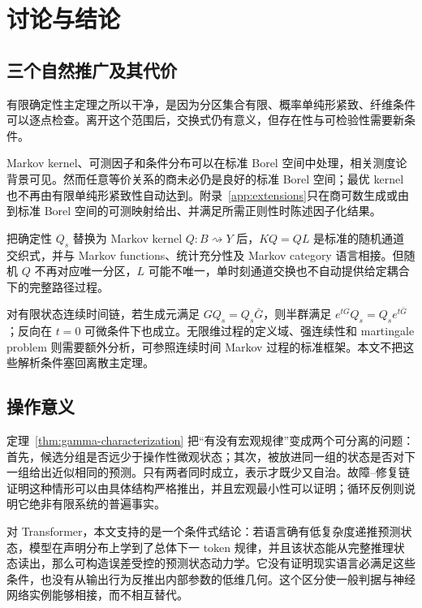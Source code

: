 \section{讨论与结论}
\label{sec:discussion}

\subsection{三个自然推广及其代价}

有限确定性主定理之所以干净，是因为分区集合有限、概率单纯形紧致、纤维条件可以逐点检查。离开这个范围后，交换式仍有意义，但存在性与可检验性需要新条件。

Markov kernel、可测因子和条件分布可以在标准 Borel 空间中处理，相关测度论背景可见\citet{Kallenberg2021}。然而任意等价关系的商未必仍是良好的标准 Borel 空间；最优 kernel 也不再由有限单纯形紧致性自动达到。附录~\ref{app:extensions}只在商可数生成或由到标准 Borel 空间的可测映射给出、并满足所需正则性时陈述因子化结果。

把确定性 $Q_s$ 替换为 Markov kernel $Q:B\rightsquigarrow Y$ 后，$KQ=QL$ 是标准的随机通道交织式，并与 Markov functions、统计充分性及 Markov category 语言相接\citep{RogersPitman1981,Fritz2020}。但随机 $Q$ 不再对应唯一分区，$L$ 可能不唯一，单时刻通道交换也不自动提供给定耦合下的完整路径过程。

对有限状态连续时间链，若生成元满足 $GQ_s=Q_s\bar G$，则半群满足 $e^{tG}Q_s=Q_se^{t\bar G}$；反向在 $t=0$ 可微条件下也成立。无限维过程的定义域、强连续性和 martingale problem 则需要额外分析，可参照连续时间 Markov 过程的标准框架\citep{EthierKurtz1986}。本文不把这些解析条件塞回离散主定理。

\subsection{操作意义}

定理~\ref{thm:gamma-characterization} 把“有没有宏观规律”变成两个可分离的问题：首先，候选分组是否远少于操作性微观状态；其次，被放进同一组的状态是否对下一组给出近似相同的预测。只有两者同时成立，表示才既少又自治。故障--修复链证明这种情形可以由具体结构严格推出，并且宏观最小性可以证明；循环反例则说明它绝非有限系统的普遍事实。

对 Transformer，本文支持的是一个条件式结论：若语言确有低复杂度递推预测状态，模型在声明分布上学到了总体下一 token 规律，并且该状态能从完整推理状态读出，那么可构造误差受控的预测状态动力学。它没有证明现实语言必满足这些条件，也没有从输出行为反推出内部参数的低维几何。这个区分使一般判据与神经网络实例能够相接，而不相互替代。

